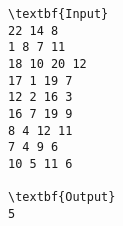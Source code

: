 \begin{verbatim}
\textbf{Input}
22 14 8
1 8 7 11
18 10 20 12
17 1 19 7
12 2 16 3
16 7 19 9
8 4 12 11
7 4 9 6
10 5 11 6

\textbf{Output}
5
\end{verbatim}